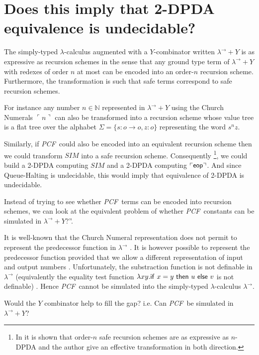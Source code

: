 \documentclass{article}
\newcommand\nat{\mathbb{N}}
\newcommand\eop{{\sf eop}}
\newcommand{\encode}[1]{\ulcorner #1 \urcorner}
\newcommand\pcf{\textsl{PCF}}
\begin{document}
\section{Does this imply that 2-DPDA equivalence is undecidable?}

The simply-typed $\lambda$-calculus augmented with a $Y$-combinator written $\lambda^\rightarrow + Y$ is as expressive as recursion schemes in the sense that any ground type term of $\lambda^\rightarrow + Y$ with redexes of order $n$ at most can be encoded into an order-$n$ recursion scheme. Furthermore, the transformation is such that safe terms correspond to safe recursion schemes.

For instance any number $n \in \nat$ represented in $\lambda^\rightarrow + Y$ using the Church Numerals $\encode{n}$ can also be transformed into a recursion scheme whose value tree is a flat tree over the alphabet $\Sigma = \{s:o\rightarrow o, z:o\}$ representing the word $s^n z$. 


Similarly, if \pcf\ could also be encoded into an equivalent recursion scheme then we could transform $SIM$ into a safe recursion scheme. Consequently \footnote{In \cite{KNU02} it is shown that order-$n$ safe recursion schemes are as expressive as $n$-DPDA and the author give an effective transformation in both direction.}, we could build a 2-DPDA computing $SIM$ and a 2-DPDA computing $\encode{\eop}$. And since Queue-Halting is undecidable, this would imply that equivalence of 2-DPDA is undecidable.

Instead of trying to see whether \pcf\ terms can be encoded into recursion schemes, we can look at the equivalent problem of whether \pcf\ constants can be simulated in $\lambda^\rightarrow + Y$?''.

It is well-known that the Church Numeral representation does not permit
to represent the predecessor function in $\lambda^\rightarrow$ \cite{DBLP:journals/jacm/FortuneLO83}. It is however possible to represent the predecessor function provided that we allow a different representation of input and output numbers \cite{DBLP:journals/jacm/FortuneLO83}.
Unfortunately, the substraction function is not definable in $\lambda^\rightarrow$ (equivalently  the equality test function $\lambda xy. {\sf if\ } x = y {\sf\ then\ } u {\sf\ else\ } v$ is not definable) \cite{DBLP:journals/jacm/FortuneLO83}.
Hence \pcf\ cannot be simulated into the simply-typed $\lambda$-calculus $\lambda^\rightarrow$.

Would the $Y$ combinator help to fill the gap? i.e. Can \pcf\ be simulated in  $\lambda^\rightarrow + Y$?  
\end{document}
